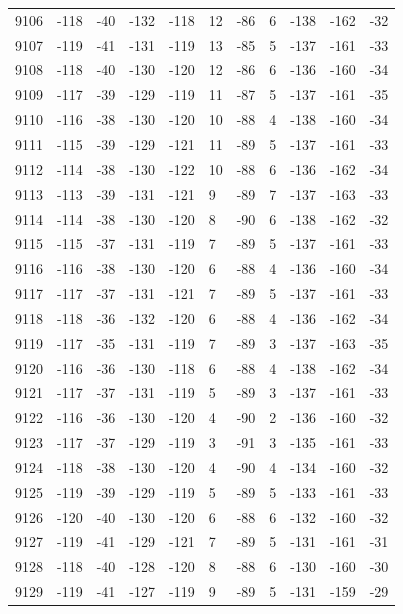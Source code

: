 \begin{table}[H]
\begin{tabular}{lllllllllll}
9106 & -118 & -40 & -132 & -118 & 12 & -86 & 6 & -138 & -162 & -32 \\
9107 & -119 & -41 & -131 & -119 & 13 & -85 & 5 & -137 & -161 & -33 \\
9108 & -118 & -40 & -130 & -120 & 12 & -86 & 6 & -136 & -160 & -34 \\
9109 & -117 & -39 & -129 & -119 & 11 & -87 & 5 & -137 & -161 & -35 \\
9110 & -116 & -38 & -130 & -120 & 10 & -88 & 4 & -138 & -160 & -34 \\
9111 & -115 & -39 & -129 & -121 & 11 & -89 & 5 & -137 & -161 & -33 \\
9112 & -114 & -38 & -130 & -122 & 10 & -88 & 6 & -136 & -162 & -34 \\
9113 & -113 & -39 & -131 & -121 & 9 & -89 & 7 & -137 & -163 & -33 \\
9114 & -114 & -38 & -130 & -120 & 8 & -90 & 6 & -138 & -162 & -32 \\
9115 & -115 & -37 & -131 & -119 & 7 & -89 & 5 & -137 & -161 & -33 \\
9116 & -116 & -38 & -130 & -120 & 6 & -88 & 4 & -136 & -160 & -34 \\
9117 & -117 & -37 & -131 & -121 & 7 & -89 & 5 & -137 & -161 & -33 \\
9118 & -118 & -36 & -132 & -120 & 6 & -88 & 4 & -136 & -162 & -34 \\
9119 & -117 & -35 & -131 & -119 & 7 & -89 & 3 & -137 & -163 & -35 \\
9120 & -116 & -36 & -130 & -118 & 6 & -88 & 4 & -138 & -162 & -34 \\
9121 & -117 & -37 & -131 & -119 & 5 & -89 & 3 & -137 & -161 & -33 \\
9122 & -116 & -36 & -130 & -120 & 4 & -90 & 2 & -136 & -160 & -32 \\
9123 & -117 & -37 & -129 & -119 & 3 & -91 & 3 & -135 & -161 & -33 \\
9124 & -118 & -38 & -130 & -120 & 4 & -90 & 4 & -134 & -160 & -32 \\
9125 & -119 & -39 & -129 & -119 & 5 & -89 & 5 & -133 & -161 & -33 \\
9126 & -120 & -40 & -130 & -120 & 6 & -88 & 6 & -132 & -160 & -32 \\
9127 & -119 & -41 & -129 & -121 & 7 & -89 & 5 & -131 & -161 & -31 \\
9128 & -118 & -40 & -128 & -120 & 8 & -88 & 6 & -130 & -160 & -30 \\
9129 & -119 & -41 & -127 & -119 & 9 & -89 & 5 & -131 & -159 & -29 \\

\end{tabular}
\end{table}

